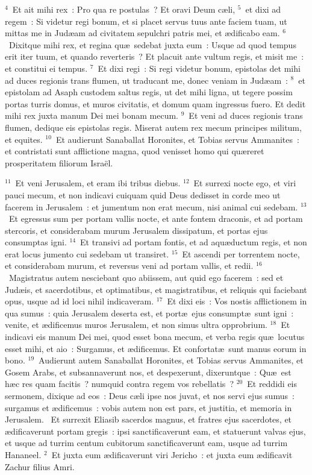${}^{4}$~Et ait mihi rex~: Pro qua re postulas~? Et oravi Deum c\ae li,
${}^{5}$~et dixi ad regem~: Si videtur regi bonum, et si placet servus tuus ante faciem tuam, ut mittas me in Jud\ae am ad civitatem sepulchri patris mei, et \ae dificabo eam.
${}^{6}$~Dixitque mihi rex, et regina qu\ae\ sedebat juxta eum~: Usque ad quod tempus erit iter tuum, et quando reverteris~? Et placuit ante vultum regis, et misit me~: et constitui ei tempus.
${}^{7}$~Et dixi regi~: Si regi videtur bonum, epistolas det mihi ad duces regionis trans flumen, ut traducant me, donec veniam in Jud\ae am~:
${}^{8}$~et epistolam ad Asaph custodem saltus regis, ut det mihi ligna, ut tegere possim portas turris domus, et muros civitatis, et domum quam ingressus fuero. Et dedit mihi rex juxta manum Dei mei bonam mecum.
${}^{9}$~Et veni ad duces regionis trans flumen, dedique eis epistolas regis. Miserat autem rex mecum principes militum, et equites.
${}^{10}$~Et audierunt Sanaballat Horonites, et Tobias servus Ammanites~: et contristati sunt afflictione magna, quod venisset homo qui qu\ae reret prosperitatem filiorum Isra\"el.


${}^{11}$~Et veni Jerusalem, et eram ibi tribus diebus.
${}^{12}$~Et surrexi nocte ego, et viri pauci mecum, et non indicavi cuiquam quid Deus dedisset in corde meo ut facerem in Jerusalem~: et jumentum non erat mecum, nisi animal cui sedebam.
${}^{13}$~Et egressus sum per portam vallis nocte, et ante fontem draconis, et ad portam stercoris, et considerabam murum Jerusalem dissipatum, et portas ejus consumptas igni.
${}^{14}$~Et transivi ad portam fontis, et ad aqu\ae ductum regis, et non erat locus jumento cui sedebam ut transiret.
${}^{15}$~Et ascendi per torrentem nocte, et considerabam murum, et reversus veni ad portam vallis, et redii.
${}^{16}$~Magistratus autem nesciebant quo abiissem, aut quid ego facerem~: sed et Jud\ae is, et sacerdotibus, et optimatibus, et magistratibus, et reliquis qui faciebant opus, usque ad id loci nihil indicaveram.
${}^{17}$~Et dixi eis~: Vos nostis afflictionem in qua sumus~: quia Jerusalem deserta est, et port\ae\ ejus consumpt\ae\ sunt igni~: venite, et \ae dificemus muros Jerusalem, et non simus ultra opprobrium.
${}^{18}$~Et indicavi eis manum Dei mei, quod esset bona mecum, et verba regis qu\ae\ locutus esset mihi, et aio~: Surgamus, et \ae dificemus. Et confortat\ae\ sunt manus eorum in bono.
${}^{19}$~Audierunt autem Sanaballat Horonites, et Tobias servus Ammanites, et Gosem Arabs, et subsannaverunt nos, et despexerunt, dixeruntque~: Qu\ae\ est h\ae c res quam facitis~? numquid contra regem vos rebellatis~?
${}^{20}$~Et reddidi eis sermonem, dixique ad eos~: Deus c\ae li ipse nos juvat, et nos servi ejus sumus~: surgamus et \ae dificemus~: vobis autem non est pars, et justitia, et memoria in Jerusalem.
~\lettrine[lines=10,image=true,loversize=0.05,lraise=-0.03]{E}{}t surrexit Eliasib sacerdos magnus, et fratres ejus sacerdotes, et \ae dificaverunt portam gregis~: ipsi sanctificaverunt eam, et statuerunt valvas ejus, et usque ad turrim centum cubitorum sanctificaverunt eam, usque ad turrim Hananeel.
${}^{2}$~Et juxta eum \ae dificaverunt viri Jericho~: et juxta eum \ae dificavit Zachur filius Amri.


